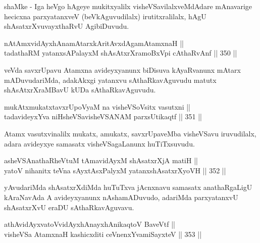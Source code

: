 \begin{artha}
shaMke - Iga heVgo hAgeye mukitxyalilx visheVSavilalxveMdAdare
mAnavarige hecicxna parxyatanxveV (beVkAguvudilalx) irutitxralilalx,
hAgU shAsatxrXvuvayxthaRvU AgibiDuvudu.
\end{artha}


\begin{shl}
nA\s \s tAmxvidAyxhAnamAtarxkAritAvxdAgamAtamxnaH || \\
tadathaRM yatanxsAPalayxM shAsAtxrXramoBxV\s pi cAthaRvAnf \hfill || 350 ||  
\end{shl}

\begin{artha}
veVda savxrUpavu Atamxna avideyxyanunx biDisuva kAyaRvanunx mAtarx
mADuvudariMda, adakAkxgi yatanxvu sAthaRkavAguvudu matutx
shAsAtxrXraMBavU kUDa sAthaRkavAguvudu.
\end{artha}

\begin{shl}
mukAtxmukatxtavxrUpoV\s yaM na visheVSoV\s sitx vasutxni || \\
tadavideyxYva niHsheVSavisheVSANAM parxsUtikaqtf \hfill || 351 ||  
\end{shl}

\begin{artha}
Atamx vasutxvinalilx mukatx, amukatx, savxrUpaveMba visheVSavu
iruvudilalx, adara avideyxye samasatx visheVSagaLanunx huTiTxsuvudu.
\end{artha}

\begin{shl}
asheVSAnathaRheVtuM tAmavidAyxM shAsatxrXjA matiH || \\
yatoV nihanitx teVna sAyxtAsxPalyxM yatanxshAsatxrXyoVH \hfill || 352 ||  
\end{shl}

\begin{artha}
yAvudariMda shAsatxrXdiMda huTuTxva jAcnxnavu samasatx anathaRgaLigU
kAraNavAda A avideyxyanunx nAshamADuvudo, adariMda parxyatanxvU
shAsatxrXvU eraDU sAthaRkavAguvavu.
\end{artha}


\begin{shl}
athAvidAyxvatoV\s vidAyxhAnayxhAnikaqtoV BaveVtf || \\
visheVSa AtamxnaH kashicxditi ceVnenxYvamiSayxteV \hfill || 353 ||  
\end{shl}

